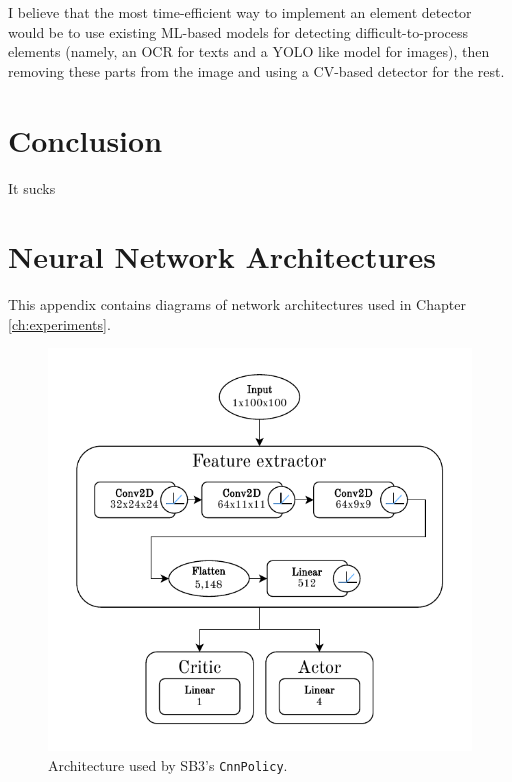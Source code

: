\documentclass[
  digital,     %
  oneside,     %
  nosansbold,  %
  nocolorbold, %
  lof,         %
  lot,         %
]{fithesis4}
\begin{document}
I believe that the most time-efficient way to implement an element detector would be to use existing ML-based models for detecting difficult-to-process elements (namely, an OCR for texts and a YOLO like model for images), then removing these parts from the image and using a CV-based detector for the rest.

\chapter*{Conclusion}
It sucks

\printbibliography[heading=bibintoc] %


\appendix %
\chapter{Neural Network Architectures}
This appendix contains diagrams of network architectures used in Chapter \ref{ch:experiments}.

\begin{figure}
    \includegraphics[width=1\linewidth]{diagrams/cnn_arch.pdf}
    \caption{Architecture used by SB3's \texttt{CnnPolicy}.}
    \label{fig:cnn_policy}
\end{figure}
\end{document}
